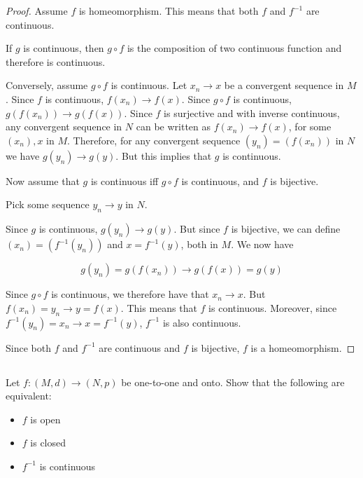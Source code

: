 \begin{proof}
Assume $f$ is homeomorphism. This means that both $f$ and $f^{-1}$ are continuous.

If $g$ is continuous, then $g \circ f$ is the composition of two continuous function and therefore is continuous.

Conversely, assume $g \circ f$ is continuous. Let $x_n \rightarrow x$ be a convergent sequence in $M$. Since $f$ is continuous, $f(x_n) \rightarrow f(x)$.
Since $g \circ f$ is continuous, $g(f(x_n)) \rightarrow g(f(x))$. Since $f$ is surjective and with inverse continuous, any convergent sequence in $N$ can be written as $f(x_n) \rightarrow f(x)$, for some $(x_n), x$ in $M$. Therefore, for any convergent sequence $(y_n) = (f(x_n))$ in $N$ we have $g(y_n) \rightarrow g(y)$. But this implies that $g$ is continuous.

\vspace{1em}

Now assume that $g$ is continuous iff $g \circ f$ is continuous, and $f$ is bijective.

Pick some sequence $y_n \rightarrow y$ in $N$.

Since $g$ is continuous, $g(y_n) \rightarrow g(y)$. But since $f$ is bijective, we can define $(x_n) = (f^{-1}(y_n))$ and $x = f^{-1}(y)$, both in $M$. We now have


$$g(y_n) = g(f(x_n)) \rightarrow g(f(x)) = g(y)$$



Since $g \circ f$ is continuous, we therefore have that $x_n \rightarrow x$. But $f(x_n) = y_n \rightarrow y = f(x)$. This means that $f$ is continuous. Moreover, since $f^{-1}(y_n) = x_n \rightarrow x = f^{-1}(y)$, $f^{-1}$ is also continuous.

Since both $f$ and $f^{-1}$ are continuous and $f$ is bijective, $f$ is a homeomorphism.

\end{proof}
    

\subsection{} Let $f : (M, d) \rightarrow (N, p)$ be one-to-one and onto. Show that the following are equivalent:
\begin{itemize}
    \item $f$ is open
    \item $f$ is closed
    \item $f^{-1}$ is continuous
\end{itemize}

